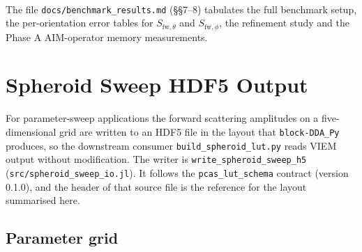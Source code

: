 \documentclass[11pt,a4paper]{article}
\begin{document}
\paragraph{}
The file \texttt{docs/benchmark\_results.md} (\S\S 7--8) tabulates
the full benchmark setup, the per-orientation error tables for
$S_{\text{fw},\theta}$ and $S_{\text{fw},\phi}$, the refinement
study and the Phase A AIM-operator memory measurements.


\section{Spheroid Sweep HDF5 Output}
\label{sec:spheroid-sweep-io}

For parameter-sweep applications the forward scattering amplitudes on a
five-dimensional grid are written to an HDF5 file in the layout that
\texttt{block-DDA\_Py}~\cite{Moteki2024} produces, so the downstream
consumer \texttt{build\_spheroid\_lut.py} reads VIEM output without
modification. The writer is \texttt{write\_spheroid\_sweep\_h5}
(\texttt{src/spheroid\_sweep\_io.jl}). It follows the
\texttt{pcas\_lut\_schema} contract (version 0.1.0), and the header of
that source file is the reference for the layout summarised here.

\subsection{Parameter grid}
\label{sec:sweep-grid}
\end{document}
